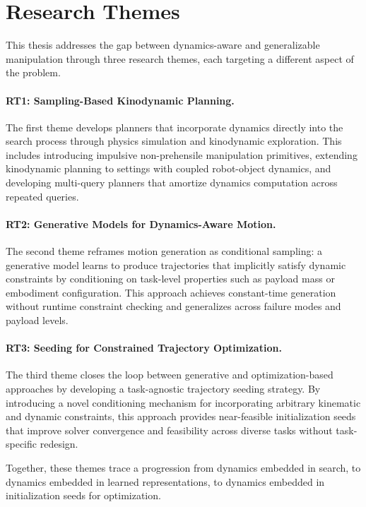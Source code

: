 \section{Research Themes}
\label{sec:intro:themes}

This thesis addresses the gap between dynamics-aware and generalizable manipulation through three research themes, each targeting a different aspect of the problem.

\paragraph{RT1: Sampling-Based Kinodynamic Planning.}
The first theme develops planners that incorporate dynamics directly into the search process through physics simulation and kinodynamic exploration.
This includes introducing impulsive non-prehensile manipulation primitives, extending kinodynamic planning to settings with coupled robot-object dynamics, and developing multi-query planners that amortize dynamics computation across repeated queries.

\paragraph{RT2: Generative Models for Dynamics-Aware Motion.}
The second theme reframes motion generation as conditional sampling: a generative model learns to produce trajectories that implicitly satisfy dynamic constraints by conditioning on task-level properties such as payload mass or embodiment configuration.
This approach achieves constant-time generation without runtime constraint checking and generalizes across failure modes and payload levels.%

\paragraph{RT3: Seeding for Constrained Trajectory Optimization.}
The third theme closes the loop between generative and optimization-based approaches by developing a task-agnostic trajectory seeding strategy.
By introducing a novel conditioning mechanism for incorporating arbitrary kinematic and dynamic constraints, this approach provides near-feasible initialization seeds that improve solver convergence and feasibility across diverse tasks without task-specific redesign.

Together, these themes trace a progression from dynamics embedded in search, to dynamics embedded in learned representations, to dynamics embedded in initialization seeds for optimization.
